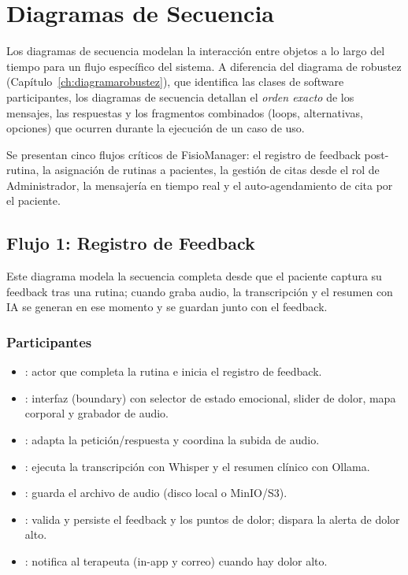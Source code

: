 
\chapter{Diagramas de Secuencia}\label{ch:diagramassecuencia}

Los diagramas de secuencia modelan la interacción entre objetos a lo largo del tiempo para un flujo específico del sistema. A diferencia del diagrama de robustez (Capítulo~\ref{ch:diagramarobustez}), que identifica las clases de software participantes, los diagramas de secuencia detallan el \emph{orden exacto} de los mensajes, las respuestas y los fragmentos combinados (loops, alternativas, opciones) que ocurren durante la ejecución de un caso de uso.

Se presentan cinco flujos críticos de FisioManager: el registro de feedback post-rutina, la asignación de rutinas a pacientes, la gestión de citas desde el rol de Administrador, la mensajería en tiempo real y el auto-agendamiento de cita por el paciente.

\section{Flujo 1: Registro de Feedback}\label{sec:sec-feedback}

Este diagrama modela la secuencia completa desde que el paciente captura su feedback tras una rutina; cuando graba audio, la transcripción y el resumen con IA se generan en ese momento y se guardan junto con el feedback.

\subsection{Participantes}

\begin{itemize}
  \item {}: actor que completa la rutina e inicia el registro de feedback.
  \item {}: interfaz (boundary) con selector de estado emocional, slider de dolor, mapa corporal y grabador de audio.
  \item {}: adapta la petición/respuesta y coordina la subida de audio.
  \item {}: ejecuta la transcripción con Whisper y el resumen clínico con Ollama.
  \item {}: guarda el archivo de audio (disco local o MinIO/S3).
  \item {}: valida y persiste el feedback y los puntos de dolor; dispara la alerta de dolor alto.
  \item {}: notifica al terapeuta (in-app y correo) cuando hay dolor alto.
\end{itemize}

